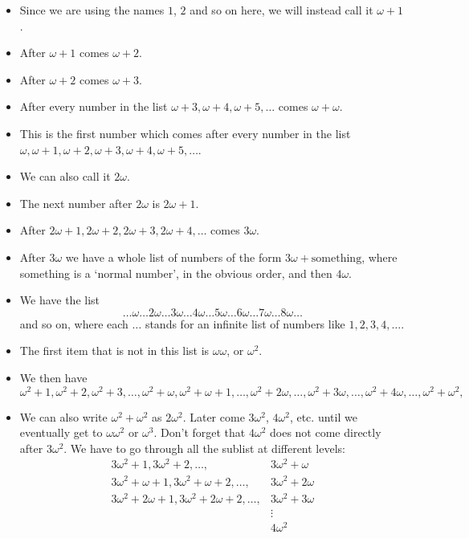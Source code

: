 \begin{itemize}
\item
Since we are using the names $1$, $2$ and so on here, we will instead call it $\omega + 1$.
\item
After $\omega + 1$ comes $\omega + 2$.
\item
After $\omega + 2$ comes $\omega + 3$.
\item
After every number in the list $\omega + 3, \omega + 4, \omega + 5, \ldots$ comes $\omega + \omega$. 
\item
This is the first number which comes after every number in the list $\omega, \omega + 1, \omega + 2, \omega + 3, \omega + 4, \omega + 5, \ldots$.
\item
We can also call it $2\omega$.
\item
The next number after $2\omega$ is $2\omega + 1$. 
\item
After $2\omega+1, 2\omega+2, 2\omega+3, 2\omega+4, \ldots$ comes $3\omega$.
\item
After $3\omega$ we have a whole list of numbers of the form $3\omega + \text{something}$, where something is a `normal number', in the obvious order, and then $4\omega$.
\item
We have the list 
\[ \ldots \omega \ldots 2\omega \ldots 3\omega \ldots 4\omega \ldots  
5\omega \ldots 6\omega \ldots 7\omega \ldots 8\omega \ldots \]
and so on, where each $\ldots$ stands for an infinite list of numbers like $1,2,3,4,\ldots$.
\item
The first item that is not in this list is $\omega \omega$, or $\omega^2$.
\item
We then have 
\[ \omega^2 + 1, \omega^2 + 2, \omega^2 + 3, \ldots, \omega^2 + \omega, \omega^2 + \omega + 1, \ldots, \omega^2 + 2\omega, \ldots, \omega^2 + 3\omega, \ldots, \omega^2 + 4\omega, \ldots, \omega^2 + \omega^2, \]
\item
We can also write $\omega^2 + \omega^2$ as $2\omega^2$. Later come $3\omega^2$, $4\omega^2$, etc. until we eventually get to $\omega \omega^2$ or $\omega^3$.
Don't forget that $4\omega^2$ does not come directly after $3\omega^2$. We have to go through all the sublist at different levels:
\begin{align*}
3\omega^2 +1, 3\omega^2 + 2, \ldots, &3\omega^2 + \omega \\   
3\omega^2 +\omega+1, 3\omega^2 +\omega+ 2, \ldots, &3\omega^2 + 2\omega \\   
3\omega^2 +2\omega+1, 3\omega^2 +2\omega+ 2, \ldots, &3\omega^2 + 3\omega \\   
& \vdots \\
&4\omega^2 \\
\end{align*}


\end{itemize}

